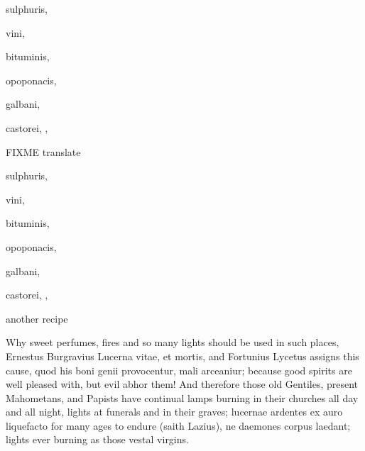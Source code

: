 {\begin{Prescription}[H]
\begin{prescriptionbox}{}{}
\item \textlatin{sulphuris},
\item \textlatin{vini},
\item \textlatin{bituminis},
\item \textlatin{opoponacis},
\item \textlatin{galbani},
\item \textlatin{castorei, \etc{}},
\end{prescriptionbox}
\begin{prescriptionbox}{FIXME translate}{}
\item \textlatin{sulphuris},
\item \textlatin{vini},
\item \textlatin{bituminis},
\item \textlatin{opoponacis},
\item \textlatin{galbani},
\item \textlatin{castorei, \etc{}},
\end{prescriptionbox}
\caption{another recipe}
\end{Prescription}

Why sweet perfumes, fires and so many lights
should be used in such places, Ernestus Burgravius Lucerna vitae, et
mortis, and Fortunius Lycetus assigns this cause, quod his boni genii
provocentur, mali arceaniur; because good spirits are well pleased
with, but evil abhor them! And therefore those old Gentiles, present
Mahometans, and Papists have continual lamps burning in their churches
all day and all night, lights at funerals and in their graves; lucernae
ardentes ex auro liquefacto for many ages to endure (saith Lazius), ne
daemones corpus laedant; lights ever burning as those vestal virgins.

}
